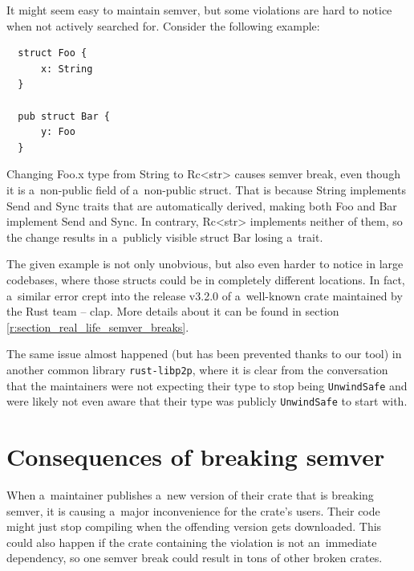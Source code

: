 \documentclass[licencjacka,en]{pracamgr}
\begin{document}
It might seem easy to maintain semver, but some violations are hard to notice
when not actively searched for. Consider the following example:
\vspace{-3pt}
\begin{verbatim}
  struct Foo {
      x: String
  }

  pub struct Bar {
      y: Foo
  }
\end{verbatim}
\vspace{-5pt}

Changing {\ttfamily Foo.x} type from {\ttfamily String} to {\ttfamily Rc<str>}
causes semver break, even though it is a~non-public field of a~non-public struct.
That is because {\ttfamily String} implements {\ttfamily Send} and {\ttfamily Sync} traits
that are automatically derived, making both {\ttfamily Foo} and {\ttfamily Bar}
implement {\ttfamily Send} and {\ttfamily Sync}.
In contrary, {\ttfamily Rc<str>} implements neither of them,
so the change results in a~publicly visible struct {\ttfamily Bar} losing a~trait.

The given example is not only unobvious, but also even harder to notice in large codebases, where
those structs could be in completely different locations. In fact, a~similar error crept into the
release v3.2.0 of a~well-known crate maintained by the Rust team -- {\ttfamily clap}. More details
about it can be found in section \ref{r:section_real_life_semver_breaks}.

The same issue almost happened (but has been prevented thanks to our tool) in another common
library \texttt{rust-libp2p}, where it is clear from the conversation \cite{issue-libp2p} that
the maintainers were not expecting their type to stop being \texttt{UnwindSafe} and were likely
not even aware that their type was publicly \texttt{UnwindSafe} to start with.

\section{Consequences of breaking semver}\label{r:section_semver_breaking_consequences}

When a~maintainer publishes a~new version of their crate that is breaking semver,
it is causing a~major inconvenience for the crate's users.
Their code might just stop compiling when the offending version gets downloaded.
This could also happen if the crate containing the violation is not an~immediate dependency,
so one semver break could result in tons of other broken crates.
\end{document}
